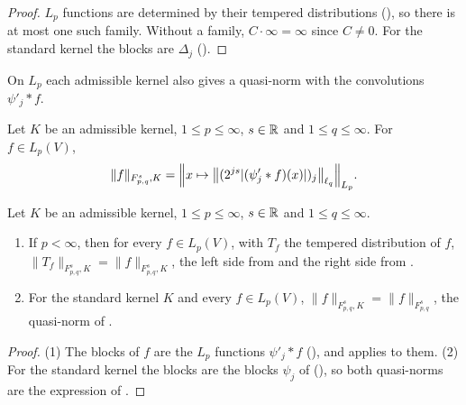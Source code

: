 \begin{proof}
\leanok
$L_p$ functions are determined by their tempered distributions
(), so there is at most one such family. Without a
family, $C \cdot \infty = \infty$ since $C \neq 0$. For the standard kernel the blocks are
$\Delta_j$ ().
\end{proof}

On $L_p$ each admissible kernel also gives a quasi-norm with the convolutions $\psi'_j * f$.

\begin{definition}
\label{def:lp-kernel-tl-norm}
\leanok
{}
Let $K$ be an admissible kernel, $1 \leq p \leq \infty$, $s \in \mathbb{R}$ and $1 \leq q \leq \infty$.
For $f \in L_p(V)$,
\[
  \|f\|_{F^s_{p,q}, K} = \Bigl\| x \mapsto \bigl\| (2^{js} |(\psi'_j * f)(x)|)_j
  \bigr\|_{\ell_q} \Bigr\|_{L_p} .
\]
\end{definition}

\begin{lemma}
\label{lem:lp-kernel-tl-norm-basic}
\leanok
{}
Let $K$ be an admissible kernel, $1 \leq p \leq \infty$, $s \in \mathbb{R}$ and $1 \leq q \leq \infty$.
\begin{enumerate}
  \item If $p < \infty$, then for every $f \in L_p(V)$, with $T_f$ the tempered distribution of
    $f$, $\|T_f\|_{F^s_{p,q}, K} = \|f\|_{F^s_{p,q}, K}$, the left side from 
    and the right side from .
  \item For the standard kernel $K$ and every $f \in L_p(V)$,
    $\|f\|_{F^s_{p,q}, K} = \|f\|_{F^s_{p,q}}$, the quasi-norm of .
\end{enumerate}
\end{lemma}

\begin{proof}
\leanok
(1) The blocks of $f$ are the $L_p$ functions $\psi'_j * f$ (),
and  applies to them. (2) For the standard kernel the blocks are the blocks
$\psi_j$ of  (), so both quasi-norms are
the expression of .
\end{proof}

